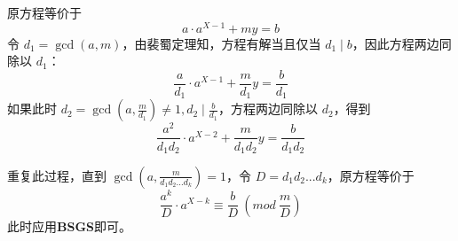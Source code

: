 \documentclass[12pt,a4paper]{article}
\begin{document}
原方程等价于
\begin{equation*}
	a\cdot a^{X-1}+my=b
\end{equation*}
令 $d_1=\gcd(a,m)$，由裴蜀定理知，方程有解当且仅当 $d_1\mid b$，因此方程两边同除以 $d_1$：
\begin{equation*}
	\displaystyle\frac{a}{d_1}\cdot a^{X-1}+\frac{m}{d_1}y=\frac{b}{d_1}
\end{equation*}
如果此时 $\displaystyle d_2=\gcd(a,\frac{m}{d_1})\neq 1, d_2\mid\frac{b}{d_1}$，方程两边同除以 $d_2$，得到 \begin{equation*}
	\displaystyle\frac{a^2}{d_1d_2}\cdot a^{X-2}+\frac{m}{d_1d_2}y=\frac{b}{d_1d_2}
\end{equation*}

重复此过程，直到 $\displaystyle\gcd(a, \frac{m}{d_1d_2...d_k})=1$，令 $D=d_1d_2...d_k$，原方程等价于
\begin{equation*}
	\displaystyle \frac{a^k}{D}\cdot a^{X-k}\equiv\frac{b}{D}\ (mod\ \frac{m}{D})
\end{equation*}
此时应用\textbf{BSGS}即可。

\newpage
\end{document}
